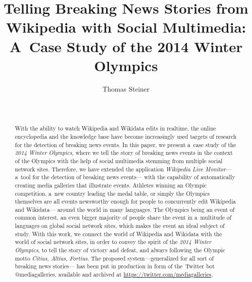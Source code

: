 \documentclass{sig-alternate-somus}
\newcommand{\inlinelistingsize}{\fontsize{8pt}{11pt}}
\let\oldurl\url
\renewcommand{\url}[1]{\inlinelistingsize\oldurl{#1}}
\begin{document}
%

\title{Telling Breaking News Stories from Wikipedia with Social Multimedia: A~Case Study of the 2014 Winter Olympics}


\author{
\alignauthor
Thomas Steiner\\
  \\
  \\
}

\maketitle
\begin{abstract}
\selectfont
With the ability to watch Wikipedia
and Wikidata edits in realtime,
the online encyclopedia and the knowledge base
have become increasingly used targets of research
for the detection of breaking news events.
In this paper, we present a~case study of the
\emph{2014 Winter Olympics}, where we tell the story of
breaking news events in the context of the Olympics
with the help of social multimedia
stemming from multiple social network sites.
Therefore, we have extended the application
\emph{Wikipedia Live Monitor}---%
a~tool for the detection of breaking news events---%
with the capability of automatically creating
media galleries that illustrate events.
Athletes winning an Olympic competition,
a~new country leading the medal table,
or simply the Olympics themselves are all events
newsworthy enough for people to concurrently
edit Wikipedia and Wikidata---%
around the world in many languages.
The Olympics being an event of common interest,
an even bigger majority of people share the event
in a~multitude of languages on global social network sites,
which makes the event an ideal subject of study.
With this work, we connect the world of
Wikipedia and Wikidata with the world of social network sites,
in order to convey the spirit of the
\emph{2014 Winter Olympics},
to tell the story of victory and defeat,
and always following the Olympic motto \emph{Citius, Altius, Fortius}.
The proposed system---generalized for all sort of breaking news stories---%
has been put in production in form of the~Twitter bot @mediagalleries,
available and archived at \url{https://twitter.com/mediagalleries}.
\end{abstract}
\end{document}
